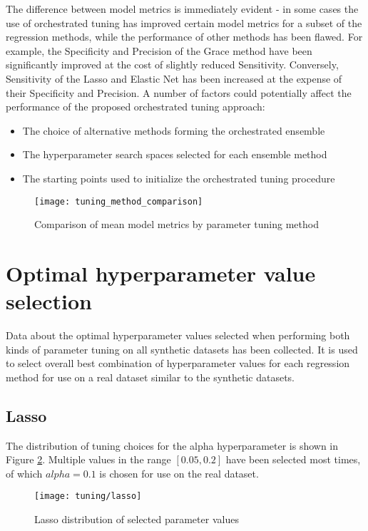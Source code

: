 

The difference between model metrics is immediately evident - in some cases the use of orchestrated tuning has improved certain model metrics for a subset of the regression methods, while the performance of other methods has been flawed. For example, the Specificity and Precision of the Grace method have been significantly improved at the cost of slightly reduced Sensitivity. Conversely, Sensitivity of the Lasso and Elastic Net has been increased at the expense of their Specificity and Precision. A number of factors could potentially affect the performance of the proposed orchestrated tuning approach:
\begin{itemize}
	\item The choice of alternative methods forming the orchestrated ensemble
	\item The hyperparameter search spaces selected for each ensemble method
	\item The starting points used to initialize the orchestrated tuning procedure
\end{itemize}

\begin{figure}[H]
	\centering
	\texttt{[image: tuning\_method\_comparison]}
	\caption{Comparison of mean model metrics by parameter tuning method}
	\label{fig:met_comp}
\end{figure}

\section{Optimal hyperparameter value selection}
Data about the optimal hyperparameter values selected when performing both kinds of parameter tuning on all synthetic datasets has been collected. It is used to select overall best combination of hyperparameter values for each regression method for use on a real dataset similar to the synthetic datasets.

\subsection{Lasso}
The distribution of tuning choices for the alpha hyperparameter is shown in Figure \ref{fig:tun_lasso}. Multiple values in the range $[0.05, 0.2]$ have been selected most times, of which $alpha = 0.1$ is chosen for use on the real dataset.
\begin{figure}[H]
	\centering
	\texttt{[image: tuning/lasso]}
	\caption{Lasso distribution of selected parameter values}
	\label{fig:tun_lasso}
\end{figure}
\pagebreak

